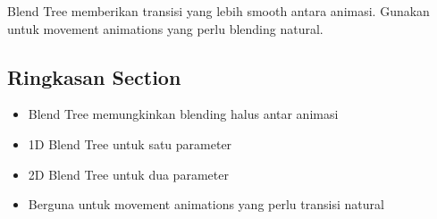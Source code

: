 \begin{catatan}
Blend Tree memberikan transisi yang lebih smooth antara animasi. Gunakan untuk movement animations yang perlu blending natural.
\end{catatan}

\subsection{Ringkasan Section}

\begin{itemize}
\item Blend Tree memungkinkan blending halus antar animasi
\item 1D Blend Tree untuk satu parameter
\item 2D Blend Tree untuk dua parameter
\item Berguna untuk movement animations yang perlu transisi natural
\end{itemize}
